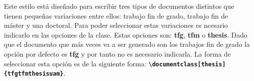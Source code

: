 
Este estilo está diseñado para escribir tres tipos de documentos distintos que tienen pequeñas variaciones entre ellos: trabajo fin de grado, trabajo fin de máster y una doctoral. Para poder seleccionar estas variaciones es ncesario indicarlo en las opciones de la clase. Estas opciones son: \textbf{tfg}, \textbf{tfm} o \textbf{thesis}. Dado que el documento que más veces va a ser generado son los trabajos fin de grado la opción por defecto es \textbf{tfg} y por tanto no es necesario indicarla. La forma de seleccionar esta opción es de la siguiente forma: \textbf{\texttt{{\textbackslash}documentclass[thesis]\{tfgtfmthesisuam\}}}.
